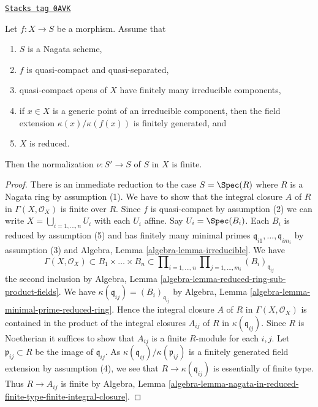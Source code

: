 \begin{lemma}
\label{morphisms-lemma-nagata-normalization-finite-general}
\href{https://stacks.math.columbia.edu/tag/0AVK}{\texttt{Stacks tag 0AVK}}

Let $f : X \to S$ be a morphism. Assume that
\begin{enumerate}
\item $S$ is a Nagata scheme,
\item $f$ is quasi-compact and quasi-separated,
\item quasi-compact opens of $X$ have finitely many irreducible components,
\item if $x \in X$ is a generic point of an irreducible component,
then the field extension $\kappa(x)/\kappa(f(x))$ is finitely
generated, and
\item $X$ is reduced.
\end{enumerate}
Then the normalization $\nu : S' \to S$ of $S$ in $X$ is finite.
\end{lemma}

\begin{proof}
There is an immediate reduction to the case $S = \Spec(R)$
where $R$ is a Nagata ring by assumption (1). We have to show that
the integral closure $A$ of $R$ in $\Gamma(X, \mathcal{O}_X)$ is
finite over $R$. Since $f$ is quasi-compact by assumption (2) we can write
$X = \bigcup_{i = 1, \ldots, n} U_i$ with each $U_i$ affine.
Say $U_i = \Spec(B_i)$. Each $B_i$ is reduced by assumption (5)
and has finitely many minimal primes
$\mathfrak q_{i1}, \ldots, \mathfrak q_{im_i}$
by assumption (3) and
Algebra, Lemma \ref{algebra-lemma-irreducible}.
We have
$$
\Gamma(X, \mathcal{O}_X) \subset B_1 \times \ldots \times B_n
\subset
\prod\nolimits_{i = 1, \ldots, n}
\prod\nolimits_{j = 1, \ldots, m_i} (B_i)_{\mathfrak q_{ij}}
$$
the second inclusion by
Algebra, Lemma \ref{algebra-lemma-reduced-ring-sub-product-fields}.
We have $\kappa(\mathfrak q_{ij}) = (B_i)_{\mathfrak q_{ij}}$ by
Algebra, Lemma \ref{algebra-lemma-minimal-prime-reduced-ring}.
Hence the integral closure $A$ of $R$ in $\Gamma(X, \mathcal{O}_X)$
is contained in the product of the integral closures $A_{ij}$ of
$R$ in $\kappa(\mathfrak q_{ij})$. Since $R$ is Noetherian
it suffices to show that $A_{ij}$ is a finite $R$-module for each $i, j$.
Let $\mathfrak p_{ij} \subset R$ be the image of $\mathfrak q_{ij}$.
As $\kappa(\mathfrak q_{ij})/\kappa(\mathfrak p_{ij})$
is a finitely generated field extension by assumption (4),
we see that $R \to \kappa(\mathfrak q_{ij})$ is essentially of finite type.
Thus $R \to A_{ij}$ is finite by Algebra, Lemma
\ref{algebra-lemma-nagata-in-reduced-finite-type-finite-integral-closure}.
\end{proof}

